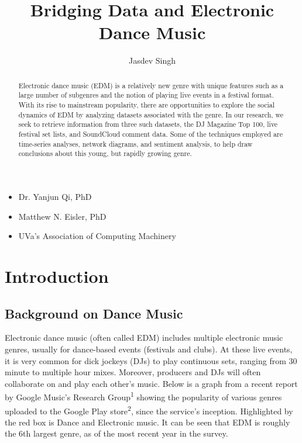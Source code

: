 \documentclass[12pt]{dalcsthesis}
\begin{document}
\mcs 
\title{Bridging Data and Electronic Dance Music}
\author{Jasdev Singh}


\nolistoftables
\nolistoffigures

\frontmatter

\begin{abstract}
Electronic dance music (EDM) is a relatively new genre with unique features such as a large number of subgenres and the  notion of playing live events in a festival format. With its rise to mainstream popularity, there are opportunities to explore the social dynamics of EDM by analyzing datasets associated with the genre. In our research, we seek to retrieve information from three such datasets, the DJ Magazine Top 100, live festival set lists, and SoundCloud comment data. Some of the techniques employed are time-series analyses, network diagrams, and sentiment analysis, to help draw conclusions about this young, but rapidly growing genre.
\end{abstract}

\begin{acknowledgements}
\begin{itemize}
	\item Dr. Yanjun Qi, PhD
	\item Matthew N. Eisler, PhD
	\item UVa's Association of Computing Machinery
\end{itemize}
\end{acknowledgements}

\mainmatter

\chapter{Introduction}

\section{Background on Dance Music}

Electronic dance music (often called EDM) includes multiple electronic music genres, usually for dance-based events (festivals and clubs). At these live events, it is very common for dick jockeys (DJs) to play continuous sets, ranging from 30 minute to multiple hour mixes. Moreover, producers and DJs will often collaborate on and play each other's music. Below is a graph from a recent report by Google Music's Research Group\textsuperscript{1} showing the popularity of various genres uploaded to the Google Play store\textsuperscript{2}, since the service's inception. Highlighted by the red box is Dance and Electronic music. It can be seen that EDM is roughly the 6th largest genre, as of the most recent year in the survey.
\end{document}
